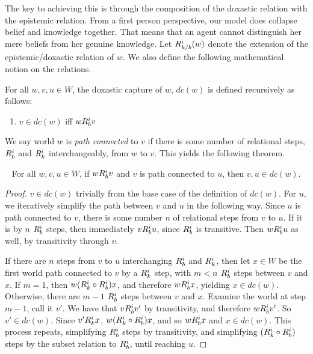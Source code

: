 The key to achieving this is through the composition of the doxastic relation with the epistemic relation. From a first person perspective, our model does collapse belief and knowledge together. That means that an agent cannot distinguish her mere beliefs from her genuine knowledge. Let $R_{k/b}^i(w)$ denote the extension of the epistemic/doxastic relation of $w$. We also define the following mathematical notion on the relations.

\begin{definition}
	For all $w,v,u\in W$, the doxastic capture of $w$, $dc(w)$ is defined recursively as follows:
	\begin{enumerate}
		\item $v\in dc(w)$ iff $wR_{b}^iv$
	\end{enumerate}
\end{definition}

We say world $w$ is \emph{path connected} to $v$ if there is some number of relational steps, $R_{b}^i$ and $R_{k}^i$ interchangeably, from $w$ to $v$. This yields the following theorem.

\begin{theorem}~\label{dpc_theorem}
For all $w,v,u\in W$, if $wR_{b}^iv$ and $v$ is path connected to $u$, then $v,u\in dc(w)$.
\end{theorem}
\begin{proof}
	$v\in dc(w)$ trivially from the base case of the definition of $dc(w)$. For $u$, we iteratively simplify the path between $v$ and $u$ in the following way. Since $u$ is path connected to $v$, there is some number $n$ of relational steps from $v$ to $u$. If it is by $n$ $R_{b}^i$ steps, then immediately $vR_{b}^iu$, since $R_{b}^i$ is transitive. Then $wR_{b}^iu$ as well, by transitivity through $v$.
	
	If there are $n$ steps from $v$ to $u$ interchanging $R_{b}^i$ and $R_{k}^i$, then let $x\in W$ be the first world path connected to $v$ by a $R_{k}^i$ step, with $m<n$ $R_{b}^i$ steps between $v$ and $x$. If $m=1$, then $w(R_{k}^i \circ R_{b}^i)x$, and therefore $wR_{b}^ix$, yielding $x\in dc(w)$. Otherwise, there are $m-1$ $R_{b}^i$ steps between $v$ and $x$. Examine the world at step $m-1$, call it $v'$. We have that $vR_{b}^iv'$ by transitivity, and therefore $wR_{b}^iv'$. So $v'\in dc(w)$. Since $v'R_{k}^ix$, $w(R_{k}^i \circ R_{b}^i)x$, and so $wR_{b}^ix$ and $x \in dc(w)$. This process repeats, simplifying $R_{b}^i$ steps by transitivity, and simplifying $(R_{k}^i \circ R_{b}^i)$ steps by the subset relation to $R_{b}^i$, until reaching $u$. 
\end{proof}


